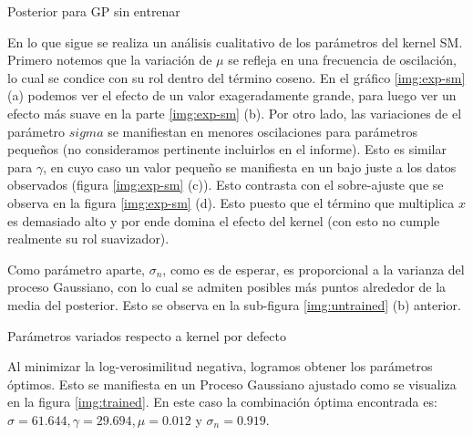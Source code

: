 \documentclass[letterpaper,11pt,oneside]{article}
\theoremstyle{break}
\begin{document}
\begin{images}[\label{img:untrained}]{Posterior para GP sin entrenar}
\end{images}

En lo que sigue se realiza un análisis cualitativo de los parámetros del kernel SM. Primero notemos que la variación de $\mu$ se refleja en una frecuencia de oscilación, lo cual se condice con su rol dentro del término coseno. En el gráfico \ref{img:exp-sm} (a) podemos ver el efecto de un valor exageradamente grande, para luego ver un efecto más suave en la parte \ref{img:exp-sm} (b). Por otro lado, las variaciones de el parámetro $sigma$ se manifiestan en menores oscilaciones para parámetros pequeños (no consideramos pertinente incluirlos en el informe). Esto es similar para $\gamma$, en cuyo caso un valor pequeño se manifiesta en un bajo juste a los datos observados (figura \ref{img:exp-sm} (c)). Esto contrasta con el sobre-ajuste que se observa en la figura \ref{img:exp-sm} (d). Esto puesto que el término que multiplica $x$ es demasiado alto y por ende domina el efecto del kernel (con esto no cumple realmente su rol suavizador).

\newp Como parámetro aparte, $\sigma_n$, como es de esperar, es proporcional a la varianza del proceso Gaussiano, con lo cual se admiten posibles más puntos alrededor de la media del posterior. Esto se observa en la sub-figura \ref{img:untrained} (b) anterior.

\begin{images}[\label{img:exp-sm}]{Parámetros variados respecto a kernel por defecto}
    \newline
\end{images}

Al minimizar la log-verosimilitud negativa, logramos obtener los parámetros óptimos. Esto se manifiesta en un Proceso Gaussiano ajustado como se visualiza en la figura \ref{img:trained}. En este caso la combinación óptima encontrada es: $\sigma=61.644,\gamma=29.694,\mu=0.012$ y $\sigma_n=0.919$.
\end{document}
